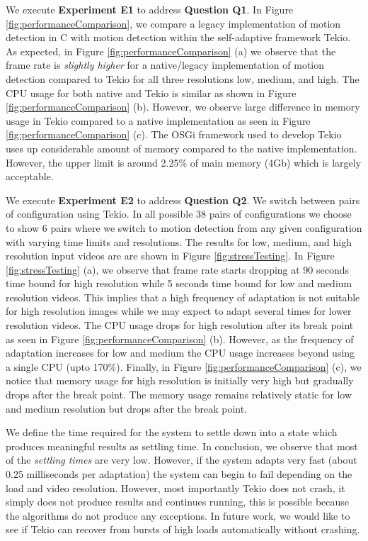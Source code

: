 \documentclass{acm_proc_article-sp}
\begin{document}
We execute  \textbf{Experiment E1} to address \textbf{Question Q1}. In Figure \ref{fig:performanceComparison}, we compare a legacy  implementation of motion detection in C with motion detection within the self-adaptive framework Tekio. As expected, in Figure \ref{fig:performanceComparison} (a) we observe that the frame rate is \emph{slightly higher} for a native/legacy implementation of motion detection compared to Tekio for all three resolutions low, medium, and high. The CPU usage for both native and Tekio is similar as shown in Figure \ref{fig:performanceComparison} (b). However, we observe large difference in memory usage in Tekio compared to a native implementation as seen in Figure \ref{fig:performanceComparison} (c). The OSGi framework used to develop Tekio uses up considerable amount of memory compared to the native implementation. However, the upper limit is around 2.25\% of main memory (4Gb) which is largely acceptable. 

We execute \textbf{Experiment E2} to address \textbf{Question Q2}. We switch between pairs of configuration using Tekio. In all possible 38 pairs of configurations we choose to show 6 pairs where we switch to motion detection from any given configuration with varying time limits and resolutions. The results for low, medium, and high resolution input videos are are shown in Figure \ref{fig:stressTesting}. In  Figure \ref{fig:stressTesting} (a), we observe that frame rate starts dropping at 90 seconds time bound for high resolution while 5 seconds time bound for low and medium resolution videos. This implies that a high frequency of adaptation is not suitable for high resolution images while we may expect to adapt several times for lower resolution videos. The CPU usage drops for high resolution after its break point as seen in Figure \ref{fig:performanceComparison} (b). However, as the frequency of adaptation increases for low and medium the CPU usage increases beyond using a single CPU (upto 170\%). Finally,  in Figure \ref{fig:performanceComparison} (c), we notice that memory usage for high resolution is initially very high but gradually drops after the break point. The memory usage remains relatively static for low and medium resolution but drops after the break point. 

We define the time required for the system to settle down into a state which produces meaningful results as settling time. In conclusion, we observe that most of the \emph{settling times} are very low. However,  if the system adapts very fast (about 0.25 milliseconds per adaptation) the system can begin to fail depending on the load and video resolution. However, most importantly Tekio does not crash, it simply does not produce results and continues running, this is possible because the algorithms do not produce any exceptions. In future work, we would like to see if Tekio can recover from bursts of high loads automatically without crashing.
\end{document}
